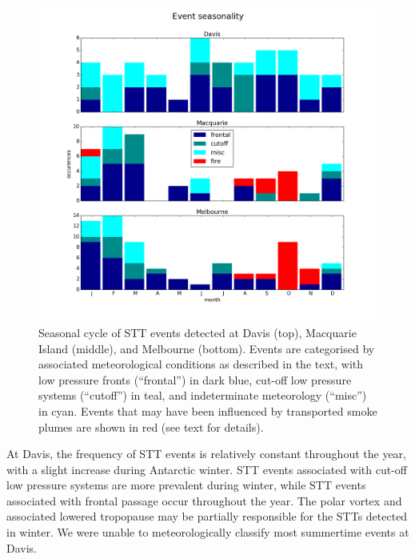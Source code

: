 \documentclass{article}
\begin{document}
  \begin{figure}[!htbp]
    \begin{center}
    \includegraphics[width=1.0\columnwidth]{figures/summary_season.png}
    \caption{Seasonal cycle of STT events detected at Davis (top), Macquarie Island (middle), and Melbourne (bottom).
      Events are categorised by associated meteorological conditions as described in the text, with low pressure fronts (“frontal”) in dark blue, cut-off low pressure systems (“cutoff”) in teal, and indeterminate meteorology (“misc”) in cyan. 
      Events that may have been influenced by transported smoke plumes are shown in red (see text for details).}
    \label{fig:SummarySeasonality}
    \end{center}
  \end{figure}
  
  At Davis, the frequency of STT events is relatively constant throughout the year, with a slight increase during Antarctic winter.
  STT events associated with cut-off low pressure systems are more prevalent during winter, while STT events associated with frontal passage occur throughout the year. 
  The polar vortex and associated lowered tropopause may be partially responsible for the STTs detected in winter.
  We were unable to meteorologically classify most summertime events at Davis.
\end{document}
